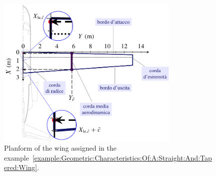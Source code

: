 \documentclass[[12pt,twoside]{book}
\begin{document}
%
\begin{figure}[t]%
    \includegraphics[width=0.78\textwidth]{Chapter_2/geometric_characteristics_of_a_straight_and_tapered_wing/wing_planform_basic_0A_drawing.pdf}%
  \caption{
            Planform of the wing assigned in the example~\ref{example:Geometric:Characteristics:Of:A:Straight:And:Tapered:Wing}.}
  \label{fig:Wing:Planform:Basic:Drawing:AB}%
\end{figure}%
%

%
\end{document}
